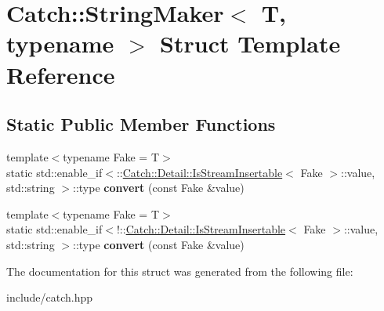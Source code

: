 \hypertarget{structCatch_1_1StringMaker}{}\section{Catch\+:\+:String\+Maker$<$ T, typename $>$ Struct Template Reference}
\label{structCatch_1_1StringMaker}
\subsection*{Static Public Member Functions}
\begin{DoxyCompactItemize}
\item 
{\footnotesize template$<$typename Fake  = T$>$ }\\static std\+::enable\+\_\+if$<$\+::\hyperlink{classCatch_1_1Detail_1_1IsStreamInsertable}{Catch\+::\+Detail\+::\+Is\+Stream\+Insertable}$<$ Fake $>$\+::value, std\+::string $>$\+::type {\bfseries convert} (const Fake \&value)\hypertarget{structCatch_1_1StringMaker_ab2c357e22b754802c4b1351257103eb6}{}\label{structCatch_1_1StringMaker_ab2c357e22b754802c4b1351257103eb6}

\item 
{\footnotesize template$<$typename Fake  = T$>$ }\\static std\+::enable\+\_\+if$<$!\+::\hyperlink{classCatch_1_1Detail_1_1IsStreamInsertable}{Catch\+::\+Detail\+::\+Is\+Stream\+Insertable}$<$ Fake $>$\+::value, std\+::string $>$\+::type {\bfseries convert} (const Fake \&value)\hypertarget{structCatch_1_1StringMaker_a68bb548de0e5ad364228b1ca3dd2f561}{}\label{structCatch_1_1StringMaker_a68bb548de0e5ad364228b1ca3dd2f561}

\end{DoxyCompactItemize}


The documentation for this struct was generated from the following file\+:\begin{DoxyCompactItemize}
\item 
include/catch.\+hpp\end{DoxyCompactItemize}
